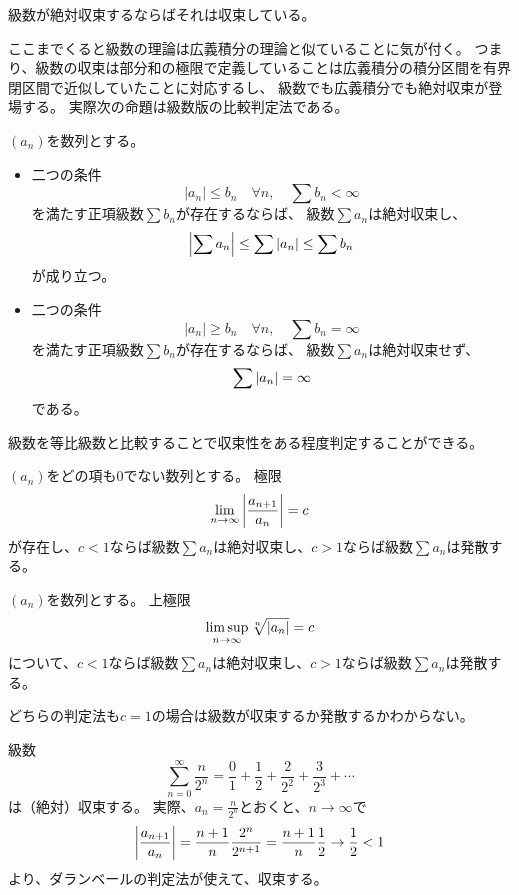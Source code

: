 \begin{remark}
級数が絶対収束するならばそれは収束している。
\end{remark}

ここまでくると級数の理論は広義積分の理論と似ていることに気が付く。
つまり、級数の収束は部分和の極限で定義していることは広義積分の積分区間を有界閉区間で近似していたことに対応するし、
級数でも広義積分でも絶対収束が登場する。
実際次の命題は級数版の比較判定法である。

\begin{proposition}[級数の比較判定法]
$(a_n)$を数列とする。
\begin{itemize}
\item
二つの条件
$$
|a_n| \le b_n \quad \forall n,
\quad \sum b_n < \infty
$$
を満たす正項級数$\sum b_n$が存在するならば、
級数$\sum a_n$は絶対収束し、
$$
\abs{\sum a_n} \le \sum \abs{a_n} \le \sum b_n
$$
が成り立つ。
\item
二つの条件
$$
|a_n| \ge b_n \quad \forall n,
\quad \sum b_n = \infty
$$
を満たす正項級数$\sum b_n$が存在するならば、
級数$\sum a_n$は絶対収束せず、
$$
\sum \abs{a_n} = \infty
$$
である。
\end{itemize}
\end{proposition}

級数を等比級数と比較することで収束性をある程度判定することができる。

\begin{theorem}[ダランベールの判定法]
$(a_n)$をどの項も$0$でない数列とする。
極限
$$
\lim_{n \to \infty}\abs{\frac{a_{n+1}}{a_n}} = c
$$
が存在し、$c < 1$ならば級数$\sum a_n$は絶対収束し、$c > 1$ならば級数$\sum a_n$は発散する。
\end{theorem}

\begin{theorem}[コーシーの判定法]
$(a_n)$を数列とする。
上極限
$$
\limsup_{n \to \infty}\sqrt[n]{\abs{a_n}} = c
$$
について、$c < 1$ならば級数$\sum a_n$は絶対収束し、$c > 1$ならば級数$\sum a_n$は発散する。
\end{theorem}

\begin{remark}
どちらの判定法も$c = 1$の場合は級数が収束するか発散するかわからない。
\end{remark}

\begin{example}
級数
$$
\sum_{n = 0}^\infty \frac{n}{2^n} = \frac{0}{1}+\frac{1}{2}+\frac{2}{2^2}+\frac{3}{2^3}+\cdots
$$
は（絶対）収束する。
実際、$a_n = \frac{n}{2^n}$とおくと、$n \to \infty$で
$$
\abs{\frac{a_{n+1}}{a_n}} = \frac{n+1}{n}\frac{2^n}{2^{n+1}} = \frac{n+1}{n}\frac{1}{2} \to \frac{1}{2} < 1
$$
より、ダランベールの判定法が使えて、収束する。
\end{example}

